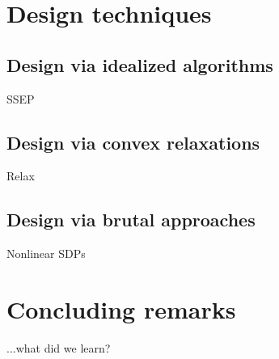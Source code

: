 \documentclass[aspectratio=169]{beamer}
\begin{document}
\begin{frame}
	\Large
	\tableofcontents
\end{frame}
\section{Design techniques}
\subsection{Design via idealized algorithms}
\begin{frame}
	\Large
\end{frame}

\begin{frame}{SSEP}

\end{frame}


\begin{frame}
	\Large
	\tableofcontents
\end{frame}
\subsection{Design via convex relaxations}
\begin{frame}
	\Large
\end{frame}
\begin{frame}{Relax}

\end{frame}


\begin{frame}
	\Large
	\tableofcontents
\end{frame}
\subsection{Design via brutal approaches}
\begin{frame}
	\Large
\end{frame}

\begin{frame}{Nonlinear SDPs}

\end{frame}




\begin{frame}
	\Large
	\tableofcontents
\end{frame}
\section{Concluding remarks}
\begin{frame}
	\Large
\end{frame}
\begin{frame}{...what did we learn?}

\end{frame}
\end{document}
